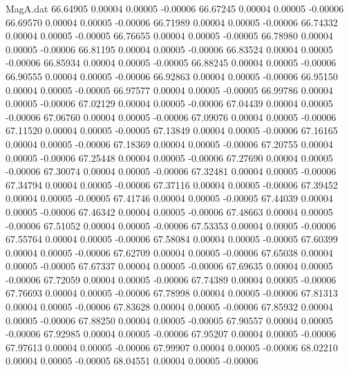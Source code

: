 \begin{filecontents}{MagA.dat}
  66.64905    0.00004    0.00005   -0.00006
  66.67245    0.00004    0.00005   -0.00006
  66.69570    0.00004    0.00005   -0.00006
  66.71989    0.00004    0.00005   -0.00006
  66.74332    0.00004    0.00005   -0.00005
  66.76655    0.00004    0.00005   -0.00005
  66.78980    0.00004    0.00005   -0.00006
  66.81195    0.00004    0.00005   -0.00006
  66.83524    0.00004    0.00005   -0.00006
  66.85934    0.00004    0.00005   -0.00005
  66.88245    0.00004    0.00005   -0.00006
  66.90555    0.00004    0.00005   -0.00006
  66.92863    0.00004    0.00005   -0.00006
  66.95150    0.00004    0.00005   -0.00005
  66.97577    0.00004    0.00005   -0.00005
  66.99786    0.00004    0.00005   -0.00006
  67.02129    0.00004    0.00005   -0.00006
  67.04439    0.00004    0.00005   -0.00006
  67.06760    0.00004    0.00005   -0.00006
  67.09076    0.00004    0.00005   -0.00006
  67.11520    0.00004    0.00005   -0.00005
  67.13849    0.00004    0.00005   -0.00006
  67.16165    0.00004    0.00005   -0.00006
  67.18369    0.00004    0.00005   -0.00006
  67.20755    0.00004    0.00005   -0.00006
  67.25448    0.00004    0.00005   -0.00006
  67.27690    0.00004    0.00005   -0.00006
  67.30074    0.00004    0.00005   -0.00006
  67.32481    0.00004    0.00005   -0.00006
  67.34794    0.00004    0.00005   -0.00006
  67.37116    0.00004    0.00005   -0.00006
  67.39452    0.00004    0.00005   -0.00005
  67.41746    0.00004    0.00005   -0.00005
  67.44039    0.00004    0.00005   -0.00006
  67.46342    0.00004    0.00005   -0.00006
  67.48663    0.00004    0.00005   -0.00006
  67.51052    0.00004    0.00005   -0.00006
  67.53353    0.00004    0.00005   -0.00006
  67.55764    0.00004    0.00005   -0.00006
  67.58084    0.00004    0.00005   -0.00005
  67.60399    0.00004    0.00005   -0.00006
  67.62709    0.00004    0.00005   -0.00006
  67.65038    0.00004    0.00005   -0.00005
  67.67337    0.00004    0.00005   -0.00006
  67.69635    0.00004    0.00005   -0.00006
  67.72059    0.00004    0.00005   -0.00006
  67.74389    0.00004    0.00005   -0.00006
  67.76693    0.00004    0.00005   -0.00006
  67.78998    0.00004    0.00005   -0.00006
  67.81313    0.00004    0.00005   -0.00006
  67.83628    0.00004    0.00005   -0.00006
  67.85932    0.00004    0.00005   -0.00006
  67.88250    0.00004    0.00005   -0.00005
  67.90557    0.00004    0.00005   -0.00006
  67.92985    0.00004    0.00005   -0.00006
  67.95207    0.00004    0.00005   -0.00006
  67.97613    0.00004    0.00005   -0.00006
  67.99907    0.00004    0.00005   -0.00006
  68.02210    0.00004    0.00005   -0.00005
  68.04551    0.00004    0.00005   -0.00006

\end{filecontents}
